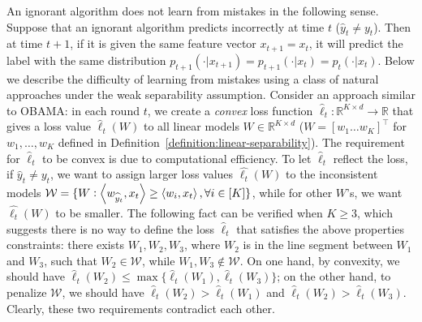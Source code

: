 An ignorant algorithm does not learn from mistakes in the following sense. Suppose that an ignorant algorithm predicts incorrectly at time $t$ ($\widehat y_t \neq y_t$). 
Then at time $t+1$, if it is given the same feature vector $x_{t+1}=x_t$, it will predict the label with the same distribution $p_{t+1}(\cdot|x_{t+1})=p_{t+1}(\cdot|x_t)=p_t(\cdot|x_t)$. 
Below we describe the difficulty of learning from mistakes using a class of natural approaches under the weak separability assumption. 
Consider an approach similar to OBAMA: in each round $t$, 
we create a \textit{convex} loss function $\widehat \ell_t: \mathbb{R}^{K\times d}\rightarrow \mathbb{R}$ that gives a loss value $\widehat \ell_t(W)$ to 
all linear models $W\in\mathbb{R}^{K\times d}$ ($W=[w_1 \ldots w_K]^\top$ for $w_1, \ldots, w_K$ defined in Definition~\ref{definition:linear-separability}). 
The requirement for $\widehat{\ell}_t$ to be convex is due to computational efficiency. 
To let $\widehat{\ell}_t$ reflect the loss, if $\widehat y_t \neq y_t$, we want to assign larger loss values $\widehat{\ell_t}(W)$ to the inconsistent models $\mathcal{W}=\{W: \left\langle w_{\widehat y_t}, x_t \right\rangle \geq \left\langle w_i, x_t \right\rangle, \forall i\in[K]\}$, 
while for other $W$'s, we want $\widehat{\ell_t}(W)$ to be smaller. 
The following fact can be verified when $K\geq 3$, which suggests there is no way to define the loss $\widehat \ell_t$ that satisfies the above properties constraints: 
there exists $W_1, W_2, W_3$, where $W_2$ is in the line segment between $W_1$ and $W_3$, such that $W_2\in \mathcal{W}$, while $W_1, W_3 \notin \mathcal{W}$. 
On one hand, by convexity, we should have $\widehat{\ell}_t(W_2)\leq \max\{\widehat{\ell}_t(W_1), \widehat{\ell}_t(W_3)\}$; 
on the other hand, to penalize $\mathcal{W}$, we should have $\widehat{\ell}_t(W_2) > \widehat{\ell}_t(W_1)$ and $\widehat{\ell}_t(W_2) > \widehat{\ell}_t(W_3)$. 
Clearly, these two requirements contradict each other. 

